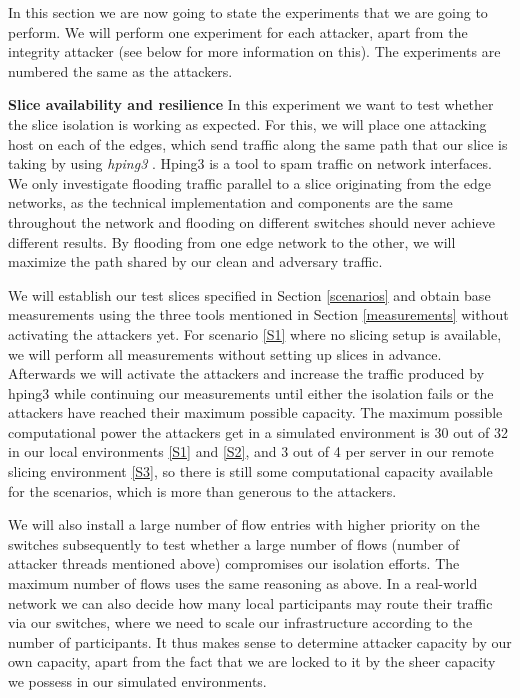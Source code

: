 In this section we are now going to state the experiments that we are going to perform. We will perform one experiment for each attacker, apart from the integrity attacker (see below for more information on this). The experiments are numbered the same as the attackers.

\begin{description}[style=multiline, labelwidth=0.7cm]
    \item[\namedlabel{E1}{E1}] \textbf{Slice availability and resilience} In this experiment we want to test whether the slice isolation is working as expected. For this, we will place one attacking host on each of the edges, which send traffic along the same path that our slice is taking by using \textit{hping3} \cite{hping3}. Hping3 is a tool to spam traffic on network interfaces. We only investigate flooding traffic parallel to a slice originating from the edge networks, as the technical implementation and components are the same throughout the network and flooding on different switches should never achieve different results. By flooding from one edge network to the other, we will maximize the path shared by our clean and adversary traffic.

    We will establish our test slices specified in Section \ref{scenarios} and obtain base measurements using the three tools mentioned in Section \ref{measurements} without activating the attackers yet. For scenario \ref{S1} where no slicing setup is available, we will perform all measurements without setting up slices in advance. Afterwards we will activate the attackers and increase the traffic produced by hping3 while continuing our measurements until either the isolation fails or the attackers have reached their maximum possible capacity. The maximum possible computational power the attackers get in a simulated environment is 30 out of 32 in our local environments \ref{S1} and \ref{S2}, and 3 out of 4 per server in our remote slicing environment \ref{S3}, so there is still some computational capacity available for the scenarios, which is more than generous to the attackers.

    We will also install a large number of flow entries with higher priority on the switches subsequently to test whether a large number of flows (number of attacker threads mentioned above) compromises our isolation efforts. The maximum number of flows uses the same reasoning as above. In a real-world network we can also decide how many local participants may route their traffic via our switches, where we need to scale our infrastructure according to the number of participants. It thus makes sense to determine attacker capacity by our own capacity, apart from the fact that we are locked to it by the sheer capacity we possess in our simulated environments.


\end{description}
